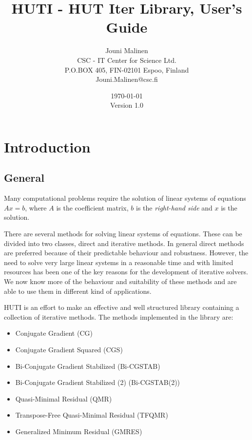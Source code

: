 \documentclass[11pt,a4paper,english,oneside]{report}
\title{HUTI - HUT Iter Library, User's Guide}
\author{Jouni Malinen\\
CSC - IT Center for Science Ltd.\\
P.O.BOX 405, FIN-02101 Espoo, Finland\\
Jouni.Malinen@csc.fi}
\date{\today\\
Version 1.0
}
\begin{document}

\setcounter{secnumdepth}{4}
\setcounter{tocdepth}{4}

\pagestyle{plain}

\maketitle

\tableofcontents
\listoftables



\chapter{Introduction}
\label{ch:intro}
\pagestyle{headings}

\section{General}

Many computational problems require the solution of linear systems of
equations $Ax = b$, where $A$ is the coefficient matrix, $b$ is
the {\em right-hand side} \/and $x$ is the solution.

There are several methods for solving linear systems of equations. These
can be divided into two classes, direct and iterative methods. In
general direct methods are preferred because of their predictable
behaviour and robustness. However, the need to solve very large linear
systems in a reasonable time and with limited resources has been one of
the key reasons for the development of iterative solvers. 
We now know more of the behaviour and suitability of these methods
and are able to use them in different kind of applications.

HUTI is an effort to make an effective and well structured library
containing a collection of iterative methods. The methods implemented
in the library are:

\begin{itemize}
\item Conjugate Gradient (CG) \cite{Bar93}
\item Conjugate Gradient Squared (CGS) \cite{Bar93}
\item Bi-Conjugate Gradient Stabilized (Bi-CGSTAB) \cite{Bar93}
\item Bi-Conjugate Gradient Stabilized (2) (Bi-CGSTAB(2))
\item Quasi-Minimal Residual (QMR) \cite{Bar93,Fre91,Fre94,Buc96}
\item Transpose-Free Quasi-Minimal Residual (TFQMR) \cite{Fre93b}
\item Generalized Minimum Residual (GMRES) \cite{Bar93,Saa96}
\end{itemize}
\end{document}
